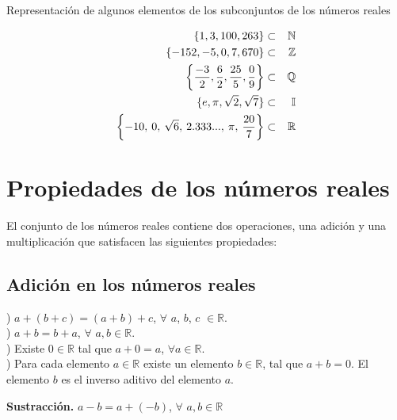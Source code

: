 \begin{myexample}
Representación de algunos elementos de los subconjuntos de los números reales
\end{myexample}

\begin{eqnarray}
\{1,3,100,263\}&\subset & \mathbb{N} \nonumber\\
\{-152,-5,0,7,670\}&\subset & \mathbb{Z} \nonumber\\
\left\{\dfrac{-3}{2},\dfrac{6}{2},\dfrac{25}{5},\dfrac{0}{9}\right\}&\subset & \mathbb{Q} \nonumber\\
\{e,\pi,\sqrt{2},\sqrt{7}\}&\subset & \mathbb{I} \nonumber\\
\left\{-10,\hspace{2px}0,\hspace{2px}\sqrt{6},\hspace{2px}2.333...,\hspace{2px}\pi,\hspace{2px}\dfrac{20}{7}\right\}&\subset & \mathbb{R} \nonumber
\end{eqnarray}

\section{Propiedades de los números reales}
\label{nr0}

El conjunto de los números reales contiene dos operaciones, una adición y una multiplicación que satisfacen las siguientes propiedades:
\subsection{Adición en los números reales}

) $a+(b+c)=(a+b)+c$, $\forall$ $a$, $b$, $c$ $\in \mathbb{R}$.\\

) $a+b=b+a$, $\forall$ $a,b\in \mathbb{R}$.\\

) Existe $0\in\mathbb{R}$ tal que $a+0=a$, $\forall a\in \mathbb{R}$.\\

) Para cada elemento $a \in \mathbb{R}$ existe un elemento $b\in\mathbb{R}$, tal que $a+b=0$. El elemento $b$ es el inverso aditivo del elemento $a$.\\

\begin{mydef}
\textbf{Sustracción.} $a-b=a+(-b)$, $\forall$ $a,b \in \mathbb{R}$ 
\end{mydef}


